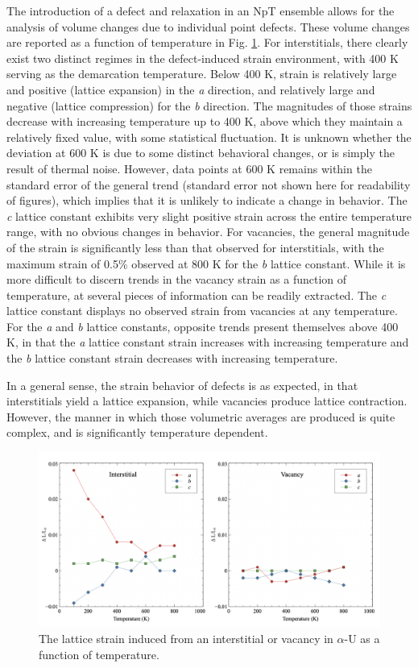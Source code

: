 \documentclass[review]{elsarticle}
\begin{document}
The introduction of a defect and relaxation in an NpT ensemble allows for the analysis of volume changes due to individual point defects. These volume changes are reported as a function of temperature in Fig. \ref{fig:strain}. For interstitials, there clearly exist two distinct regimes in the defect-induced strain environment, with 400 K serving as the demarcation temperature. Below 400 K, strain is relatively large and positive (lattice expansion) in the \textit{a} direction, and relatively large and negative (lattice compression) for the \textit{b} direction. The magnitudes of those strains decrease with increasing temperature up to 400 K, above which they maintain a relatively fixed value, with some statistical fluctuation. It is unknown whether the deviation at 600 K is due to some distinct behavioral changes, or is simply the result of thermal noise. However, data points at 600 K remains within the standard error of the general trend (standard error not shown here for readability of figures), which implies that it is unlikely to indicate a change in behavior. The \textit{c} lattice constant exhibits very slight positive strain across the entire temperature range, with no obvious changes in behavior. For vacancies, the general magnitude of the strain is significantly less than that observed for interstitials, with the maximum strain of 0.5\% observed at 800 K for the \textit{b} lattice constant. While it is more difficult to discern trends in the vacancy strain as a function of temperature, at several pieces of information can be readily extracted. The \textit{c} lattice constant displays no observed strain from vacancies at any temperature. For the \textit{a} and \textit{b} lattice constants, opposite trends present themselves above 400 K, in that the \textit{a} lattice constant strain increases with increasing temperature and the \textit{b} lattice constant strain decreases with increasing temperature. 

In a general sense, the strain behavior of defects is as expected, in that interstitials yield a lattice expansion, while vacancies produce lattice contraction. However, the manner in which those volumetric averages are produced is quite complex, and is significantly temperature dependent. 

 \begin{figure}[hbt]
	\centering
	\includegraphics[width=1.0\textwidth]{fig5.png}
    \caption{The lattice strain induced from an interstitial or vacancy in $\alpha$-U as a function of temperature. }\label{fig:strain}
\end{figure}
\end{document}
